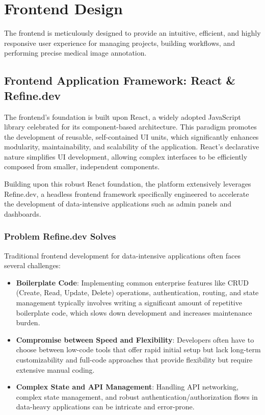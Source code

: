\section{Frontend Design}
The frontend is meticulously designed to provide an intuitive, efficient, and highly responsive user experience for managing projects, building workflows, and performing precise medical image annotation.
\subsection{Frontend Application Framework: React \& Refine.dev}
The frontend's foundation is built upon React, a widely adopted JavaScript library celebrated for its component-based architecture. This paradigm promotes the development of reusable, self-contained UI units, which significantly enhances modularity, maintainability, and scalability of the application. React's declarative nature simplifies UI development, allowing complex interfaces to be efficiently composed from smaller, independent components. 

Building upon this robust React foundation, the platform extensively leverages Refine.dev, a headless frontend framework specifically engineered to accelerate the development of data-intensive applications such as admin panels and dashboards.

\subsubsection*{Problem Refine.dev Solves}
Traditional frontend development for data-intensive applications often faces several challenges:
\begin{itemize}
    \item \textbf{Boilerplate Code}: Implementing common enterprise features like CRUD (Create, Read, Update, Delete) operations, authentication, routing, and state management typically involves writing a significant amount of repetitive boilerplate code, which slows down development and increases maintenance burden.
    \item \textbf{Compromise between Speed and Flexibility}: Developers often have to choose between low-code tools that offer rapid initial setup but lack long-term customizability and full-code approaches that provide flexibility but require extensive manual coding.
    \item \textbf{Complex State and API Management}: Handling API networking, complex state management, and robust authentication/authorization flows in data-heavy applications can be intricate and error-prone.
\end{itemize}

